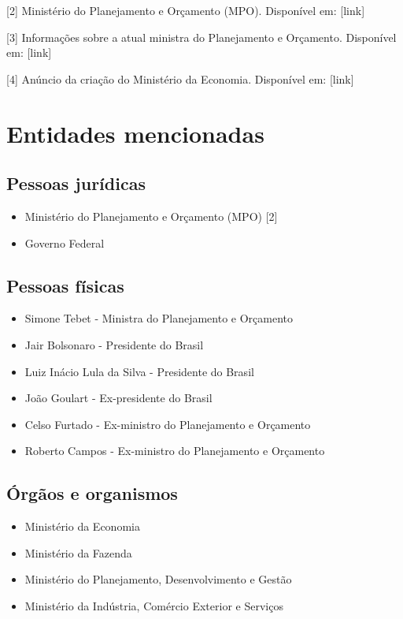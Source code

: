 \documentclass[
   article,       
   12pt,          
   oneside,       
   a4paper,       
   english,       
   brazil,        
   sumario=tradicional
   ]{abntex2}
\begin{document}
[2] Ministério do Planejamento e Orçamento (MPO). Disponível em: [link]

[3] Informações sobre a atual ministra do Planejamento e Orçamento. Disponível em: [link]

[4] Anúncio da criação do Ministério da Economia. Disponível em: [link]
\section{Entidades mencionadas}
\subsection{Pessoas jurídicas}
\begin{itemize}
    \item Ministério do Planejamento e Orçamento (MPO) [2]
    \item Governo Federal
\end{itemize}

\subsection{Pessoas físicas}
\begin{itemize}
    \item Simone Tebet - Ministra do Planejamento e Orçamento
    \item Jair Bolsonaro - Presidente do Brasil
    \item Luiz Inácio Lula da Silva - Presidente do Brasil
    \item João Goulart - Ex-presidente do Brasil
    \item Celso Furtado - Ex-ministro do Planejamento e Orçamento
    \item Roberto Campos - Ex-ministro do Planejamento e Orçamento
\end{itemize}

\subsection{Órgãos e organismos}
\begin{itemize}
    \item Ministério da Economia
    \item Ministério da Fazenda
    \item Ministério do Planejamento, Desenvolvimento e Gestão
    \item Ministério da Indústria, Comércio Exterior e Serviços
\end{itemize}
\end{document}

